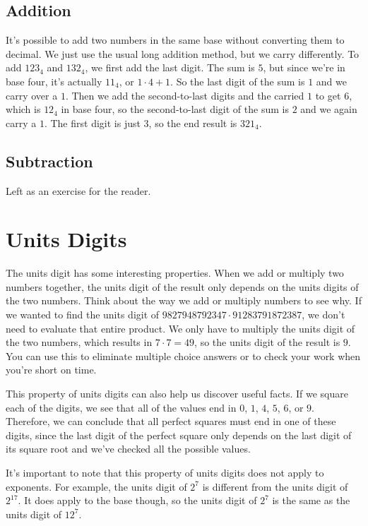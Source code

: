 \documentclass{article}
\begin{document}
\begin{multicols}{2}
	\subsection*{Addition}
	It's possible to add two numbers in the same base without converting them to decimal.
	We just use the usual long addition method, but we carry differently.
	To add $123_4$ and $132_4$, we first add the last digit.
	The sum is $5$, but since we're in base four, it's actually $11_4$, or $1 \cdot 4 + 1$.
	So the last digit of the sum is $1$ and we carry over a $1$.
	Then we add the second-to-last digits and the carried $1$ to get $6$, which is $12_4$ in base four, so the second-to-last digit of the sum is $2$ and we again carry a $1$.
	The first digit is just $3$, so the end result is $321_4$.

	\subsection*{Subtraction}
	Left as an exercise for the reader.

	\section*{Units Digits}
	The units digit has some interesting properties.
	When we add or multiply two numbers together, the units digit of the result only depends on the units digits of the two numbers.
	Think about the way we add or multiply numbers to see why.
	If we wanted to find the units digit of $9827948792347 \cdot 91283791872387$, we don't need to evaluate that entire product.
	We only have to multiply the units digit of the two numbers, which results in $7 \cdot 7 = 49$, so the units digit of the result is $9$.
	You can use this to eliminate multiple choice answers or to check your work when you're short on time.
	
	This property of units digits can also help us discover useful facts.
	If we square each of the digits, we see that all of the values end in $0$, $1$, $4$, $5$, $6$, or $9$.
	Therefore, we can conclude that all perfect squares must end in one of these digits, since the last digit of the perfect square only depends on the last digit of its square root and we've checked all the possible values.

	It's important to note that this property of units digits does not apply to exponents.
	For example, the units digit of $2^7$ is different from the units digit of $2^17$.
	It does apply to the base though, so the units digit of $2^7$ is the same as the units digit of $12^7$.


\end{multicols}
\end{document}
